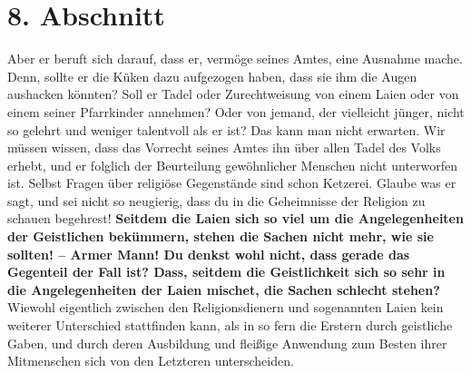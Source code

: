 \section{8. Abschnitt} \label{kap12_ab8}

Aber er beruft sich darauf, dass er, vermöge seines Amtes, eine
Ausnahme mache.
Denn, sollte er die Küken dazu aufgezogen haben, dass sie ihm die Augen
aushacken könnten? Soll er Tadel oder Zurechtweisung von einem
Laien oder von
einem seiner Pfarrkinder annehmen? Oder von jemand, der vielleicht jünger, nicht
so gelehrt und weniger talentvoll als er ist? Das kann man nicht erwarten. Wir
müssen wissen, dass das Vorrecht seines Amtes ihn über allen Tadel des Volks
erhebt, und er folglich der Beurteilung gewöhnlicher Menschen nicht unterworfen
ist. Selbst Fragen über religiöse Gegenstände sind schon
Ketzerei. Glaube was er
sagt, und sei nicht so neugierig, dass du in die Geheimnisse der
Religion zu
schauen begehrest! \label{ref:12_08_eitle_menschen_leihen_vs_geisltichkeit}
\textbf{Seitdem die Laien sich so viel um die Angelegenheiten
der
Geistlichen bekümmern, stehen die Sachen nicht mehr, wie sie sollten! -- Armer
Mann! Du denkst wohl nicht, dass gerade das Gegenteil der Fall ist? Dass, seitdem
die Geistlichkeit sich so sehr in die Angelegenheiten der Laien mischet, die
Sachen schlecht stehen?} Wiewohl eigentlich zwischen den Religionsdienern und
sogenannten Laien kein weiterer Unterschied stattfinden kann, als in so fern
die Erstern durch geistliche Gaben, und durch deren Ausbildung und fleißige
Anwendung zum Besten ihrer Mitmenschen sich von den Letzteren unterscheiden.

